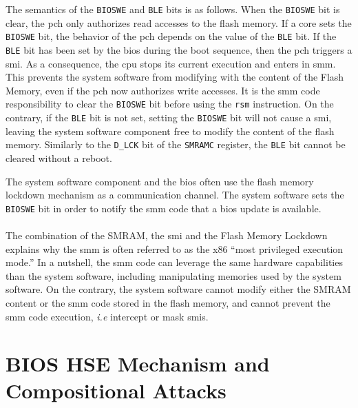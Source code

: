 The semantics of the \texttt{BIOSWE} and \texttt{BLE} bits is as follows.
%
When the \texttt{BIOSWE} bit is clear, the \ac{pch} only authorizes read
accesses to the flash memory.
%
If a core sets the \texttt{BIOSWE} bit, the behavior of the \ac{pch} depends on
the value of the \texttt{BLE} bit.
%
If the \texttt{BLE} bit has been set by the \ac{bios} during the boot sequence,
then the \ac{pch} triggers a \ac{smi}.
%
As a consequence, the \ac{cpu}  stops its current
execution and enters in \ac{smm}.
%
This prevents the system software from modifying with the content of the Flash
Memory, even if the \ac{pch} now authorizes write accesses.
%
It is the \ac{smm} code responsibility to clear the \texttt{BIOSWE} bit before
using the \texttt{rsm} instruction.
%
On the contrary, if the \texttt{BLE} bit is not set, setting the \texttt{BIOSWE}
bit will not cause a \ac{smi}, leaving the system software component free to
modify the content of the flash memory.
%
Similarly to the \texttt{D\_LCK} bit of the \texttt{SMRAMC} register, the
\texttt{BLE} bit cannot be cleared without a reboot.

The system software component and the \ac{bios} often use the flash memory
lockdown mechanism as a communication channel.
%
The system software sets the \texttt{BIOSWE} bit in order to notify the \ac{smm}
code that a \ac{bios} update is available.

\paragraph{}
%
The combination of the SMRAM, the \ac{smi} and the Flash Memory Lockdown
explains why the \ac{smm} is often referred to as the x86 ``most privileged
execution mode.''
%
In a nutshell, the \ac{smm} code can leverage the same hardware capabilities
than the system software, including manipulating memories used by the
system software.
%
On the contrary, the system software cannot modify either the SMRAM content or
the \ac{smm} code stored in the flash memory, and cannot prevent the \ac{smm}
code execution, \emph{i.e} intercept or mask \acp{smi}.



\section{BIOS HSE Mechanism and Compositional Attacks}
\label{sec:usecase:hse}

